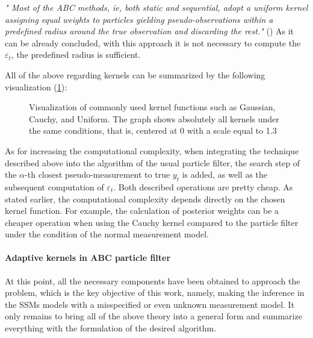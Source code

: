 \begin{itemize}
    {\em
    "
    Most of the ABC methods, ie, both static and sequential, adopt a uniform kernel assigning equal weights to particles yielding pseudo-observations within a predefined radius around the true observation and discarding the rest."
    } (\cite{dedecius_marginalized_2018})
    As it can be already concluded, with this approach it is not necessary to compute the \(\varepsilon_t\), the predefined radius is sufficient.
\end{itemize}

All of the above regarding kernels can be summarized by the following visualization (\ref{fig:commonly_used_kernels}):

\begin{figure}[!ht]
\centering
\caption{Visualization of commonly used kernel functions such as Gaussian, Cauchy, and Uniform. The graph shows absolutely all kernels under the same conditions, that is, centered at 0 with a scale equal to 1.3}
\label{fig:commonly_used_kernels}
\end{figure}

As for increasing the computational complexity, when integrating the technique described above into the algorithm of the usual particle filter, the search step of the \(\alpha\)-th closest pseudo-measurement to true \(y_t\) is added, as well as the subsequent computation of \(\varepsilon_t\). Both described operations are pretty cheap. As stated earlier, the computational complexity depends directly on the chosen kernel function. For example, the calculation of posterior weights can be a cheaper operation when using the Cauchy kernel compared to the particle filter under the condition of the normal measurement model.

\paragraph*{Adaptive kernels in ABC particle filter} 
At this point, all the necessary components have been obtained to approach the problem, which is the key objective of this work, namely, making the inference in the SSMs models with a misspecified or even unknown measurement model. It only remains to bring all of the above theory into a general form and summarize everything with the formulation of the desired algorithm.

